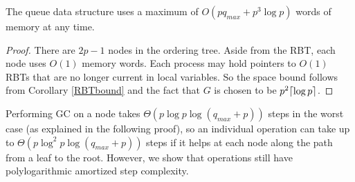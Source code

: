 \begin{mytheorem}\label{spaceBound}
The queue data structure uses a maximum of $O(pq_{max}+p^3\log p)$ words of memory at any time.
\end{mytheorem}
\begin{proof}
There are $2p-1$ nodes in the ordering tree.  Aside from the RBT, each node uses $O(1)$ memory words.
Each process may hold pointers to $O(1)$ RBTs that are no longer current in local variables.
So the space bound follows from Corollary \ref{RBTbound} and the fact that $G$ is chosen
to be $p^2\lceil \log p \rceil$.
\end{proof}

Performing GC on a node takes $\Theta(p \log p\log(q_{max}+p))$ steps in the worst case (as explained in the following proof),
so an individual operation can take up to $\Theta(p \log^2 p\log(q_{max}+p))$ steps
if it helps at each node along the path from a leaf to the root.
However,
we show that operations still have polylogarithmic amortized step complexity.

